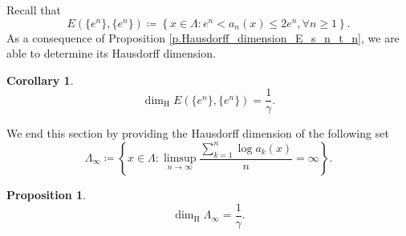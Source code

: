 \documentclass[12pt,reqno]{amsart}
\renewcommand{\=}{\coloneqq}
\theoremstyle{plain}
\newtheorem{cor}[theorem]{Corollary}
\newtheorem{proposition}[theorem]{Proposition}
\begin{document}
Recall that
            \begin{equation}\label{e.def_D}
        E(\{e^n\}, \{e^n\})\coloneqq
         \left\{x\in  \Lambda:e^n<a_n(x)\leq 2e^{n},
        \forall n\geq 1\right\}.
        \end{equation}
        As a consequence of Proposition \ref{p.Hausdorff_dimension_E_s_n_t_n}, we are able to determine its Hausdorff dimension.

        \begin{cor}\label{c.D}
        \begin{equation*}
        \dim_{\mathrm{H}}E(\{e^n\},\{e^n\}) =\frac{1}{\gamma}.
        \end{equation*}
        \end{cor}


We end this section by providing the Hausdorff dimension of the following set
        \begin{equation}\label{e.def_pi_infty}
                \Lambda_{\infty}\coloneqq
                \left\{x\in \Lambda:
                \limsup_{n\to\infty}\frac{\sum^n_{k=1}\log a_k(x)}{n}
                =\infty\right\}.
        \end{equation}



        \begin{proposition}\label{l.Hausdorff_dimension_limsup_log_pi/n}
        \begin{equation*}
                \dim_{\mathrm{H}}\Lambda_{\infty}
                =\frac{1}{\gamma}.
        \end{equation*}
\end{proposition}
\end{document}
